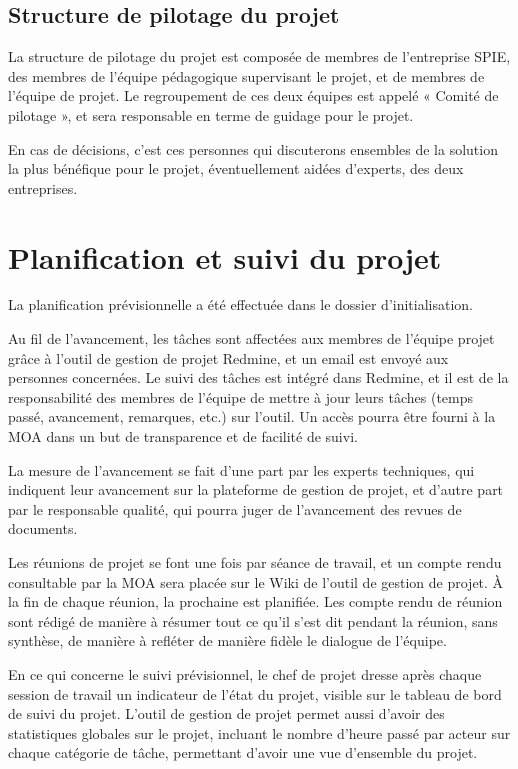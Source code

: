 \documentclass[a4paper, 18pt]{article}
\begin{document}
\subsection{Structure de pilotage du projet}

La structure de pilotage du projet est composée de membres de l'entreprise SPIE, des membres de l'équipe pédagogique supervisant le projet, et de membres de l'équipe de projet. Le regroupement de ces deux équipes est appelé « Comité de pilotage », et sera responsable en terme de guidage pour le projet.

En cas de décisions, c'est ces personnes qui discuterons ensembles de la solution la plus bénéfique pour le projet, éventuellement aidées d'experts, des deux entreprises.

\section{Planification et suivi du projet }

La planification prévisionnelle a été effectuée dans le dossier d'initialisation.

Au fil de l'avancement, les tâches sont affectées aux membres de l'équipe projet grâce à l'outil de gestion de projet Redmine, et un email est envoyé aux personnes concernées. Le suivi des tâches est intégré dans Redmine, et il est de la responsabilité des membres de l'équipe de mettre à jour leurs tâches (temps passé, avancement, remarques, etc.) sur l'outil. Un accès pourra être fourni à la MOA dans un but de transparence et de facilité de suivi.

La mesure de l'avancement se fait d'une part par les experts techniques, qui indiquent leur avancement sur la plateforme de gestion de projet, et d'autre part par le responsable qualité, qui pourra juger de l'avancement des revues de documents.

Les réunions de projet se font une fois par séance de travail, et un compte rendu consultable par la MOA sera placée sur le Wiki de l'outil de gestion de projet. À la fin de chaque réunion, la prochaine est planifiée. Les compte rendu de réunion sont rédigé de manière à résumer tout ce qu'il s'est dit pendant la réunion, sans synthèse, de manière à refléter de manière fidèle le dialogue de l'équipe.

En ce qui concerne le suivi prévisionnel, le chef de projet dresse après chaque session de travail un indicateur de l'état du projet, visible sur le tableau de bord de suivi du projet. L'outil de gestion de projet permet aussi d'avoir des statistiques globales sur le projet, incluant le nombre d'heure passé par acteur sur chaque catégorie de tâche, permettant d'avoir une vue d'ensemble du projet.
\end{document}
